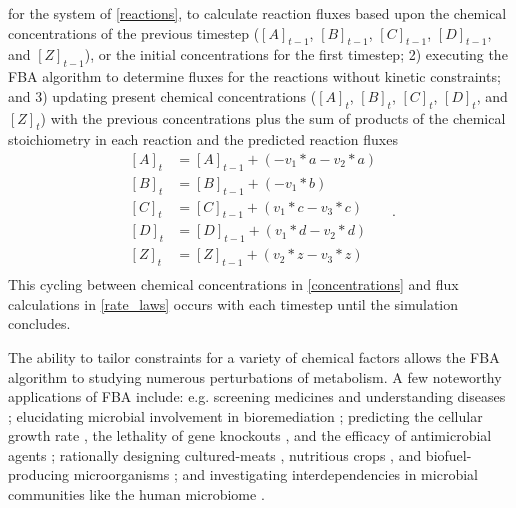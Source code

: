 for the system of \cref{reactions}, to calculate reaction fluxes based upon the chemical concentrations of the previous timestep ($[A]_{t-1}$, $[B]_{t-1}$, $[C]_{t-1}$, $[D]_{t-1}$, and $[Z]_{t-1}$), or the initial concentrations for the first timestep; 2) executing the FBA algorithm to determine fluxes for the reactions without kinetic constraints; and 3) updating present chemical concentrations ($[A]_t$, $[B]_t$, $[C]_t$, $[D]_t$, and $[Z]_t$) with the previous concentrations plus the sum of products of the chemical stoichiometry in each reaction and the predicted reaction fluxes
\begin{equation} \label{concentrations}
    \begin{split}
        [A]_t &= [A]_{t-1} +(- v_1*a - v_2*a)\\
        [B]_t &= [B]_{t-1} +(- v_1*b)\\
        [C]_t &= [C]_{t-1} + (v_1*c - v_3*c)\\
        [D]_t &= [D]_{t-1} + (v_1*d - v_2*d)\\
        [Z]_t &= [Z]_{t-1} + (v_2*z - v_3*z)\\
    \end{split}~~~.
\end{equation}
This cycling between chemical concentrations in \cref{concentrations} and flux calculations in \cref{rate_laws} occurs with each timestep until the simulation concludes. 

The ability to tailor constraints for a variety of chemical factors allows the FBA algorithm to studying numerous perturbations of metabolism. A few noteworthy applications of FBA include: e.g. screening medicines and understanding diseases \cite{Chowdhury2020LeveragingApplications}; elucidating microbial involvement in bioremediation \cite{Rubinstein2021ORTCodes}; predicting the cellular growth rate \cite{Kauffman2003AdvancesAnalysis}, the lethality of gene knockouts \cite{Covert2008IntegratingColi}, and the efficacy of antimicrobial agents \cite{Lee2006FluxMetabolomics}; rationally designing cultured-meats \cite{Suthers2020ChallengesModeling}, nutritious crops \cite{Schwender2008MetabolicPlants, Allen2009MetabolicComplexity, Potrykus2001GoldenAward, Tang2009GoldenA}, and biofuel-producing microorganisms \cite{Pham2021Genome-scaleProduction}; and investigating interdependencies in microbial communities \cite{Zomorrodi2012OptCom:Communities, Khandelwal2013CommunityGrowth} like the human microbiome \cite{Shoaie2015QuantifyingMicrobiome, Kumar2019ModellingMicrobiome}.

